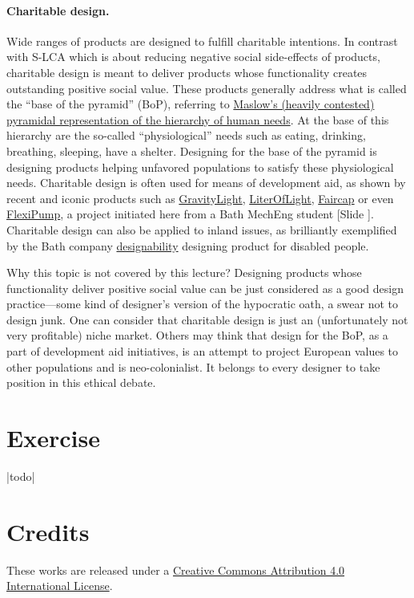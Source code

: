 \documentclass{article}
\newcounter{slide}
\newcounter{exercise}
\begin{document}
\paragraph{Charitable design.} Wide ranges of products are designed to fulfill charitable intentions. In contrast with S-LCA which is about reducing negative social side-effects of products, charitable design is meant to deliver products whose functionality creates outstanding positive social value. These products generally address what is called the ``base of the pyramid'' (BoP), referring to \href{https://en.wikipedia.org/wiki/Maslow\%27s_hierarchy_of_needs}{Maslow's (heavily contested) pyramidal representation of the hierarchy of human needs}. At the base of this hierarchy are the so-called ``physiological'' needs such as eating, drinking, breathing, sleeping, have a shelter. Designing for the base of the pyramid is designing products helping unfavored populations to satisfy these physiological needs. Charitable design is often used for means of development aid, as shown by recent and iconic products such as \href{https://gravitylight.org/}{GravityLight}, \href{http://literoflightswitzerland.org/}{LiterOfLight}, \href{http://faircap.org/}{Faircap} or even \href{https://www.flexipump.com/}{FlexiPump}, a project initiated here from a Bath MechEng student {\color{blue}[Slide ]}. Charitable design can also be applied to inland issues, as brilliantly exemplified by the Bath company \href{https://designability.org.uk/}{designability} designing product for disabled people. 

Why this topic is not covered by this lecture? Designing products whose functionality deliver positive social value can be just considered as a good design practice---some kind of designer's version of the hypocratic oath, a swear not to design junk. One can consider that charitable design is just an (unfortunately not very profitable) niche market. Others may think that design for the BoP, as a part of development aid initiatives, is an attempt to project European values to other populations and is neo-colonialist. It belongs to every designer to take position in this ethical debate.


\section{Exercise}
\label{sec:exercise}
{\color{red}|todo|}

\section*{Credits}
\label{sec:credits}
These works are released under a \href{https://creativecommons.org/licenses/by/4.0/}{Creative Commons Attribution 4.0 International License}.



\end{document}
